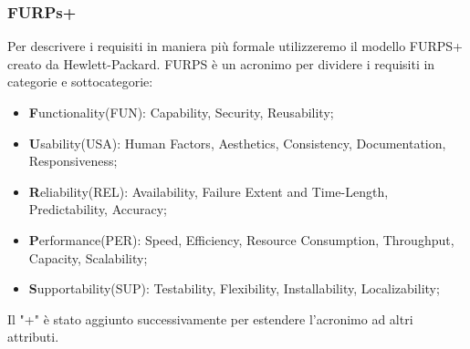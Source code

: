 \subsubsection{FURPs+}
Per descrivere i requisiti in maniera più formale utilizzeremo il modello FURPS+\cite{furps} creato da Hewlett-Packard.
FURPS è un acronimo per dividere i requisiti in categorie e sottocategorie:
\begin{itemize}
\item \textbf{F}unctionality(FUN): Capability, Security, Reusability;
\item \textbf{U}sability(USA): Human Factors, Aesthetics, Consistency, Documentation, Responsiveness;
\item \textbf{R}eliability(REL): Availability, Failure Extent and Time-Length, Predictability, Accuracy;
\item \textbf{P}erformance(PER): Speed, Efficiency, Resource Consumption, Throughput, Capacity, Scalability;
\item \textbf{S}upportability(SUP): Testability, Flexibility, Installability, Localizability;
\end{itemize}
Il "+" è stato aggiunto successivamente per estendere l'acronimo ad altri attributi.

